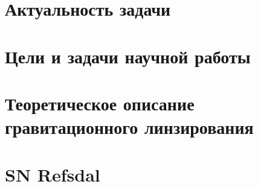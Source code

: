 % 
    
    \section{Актуальность задачи}
        
    
    \section{Цели и задачи научной работы}
        
    
    \section{Теоретическое описание гравитационного линзирования}
   
        
   
    \section{SN Refsdal}
        
   
   